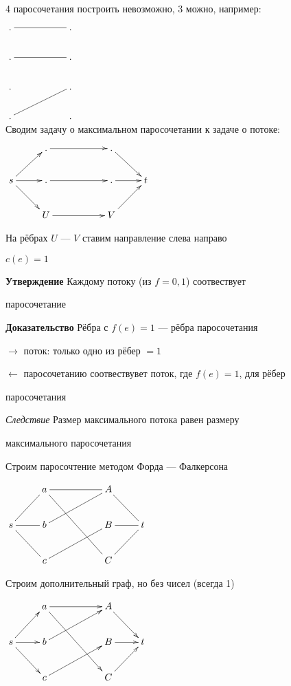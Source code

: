 \documentclass[a4paper, 12pt] {article}
\begin{document}
4 паросочетания построить невозможно, 3 можно, например:

 $\xymatrix{
	.  \ar@{-}[rr]  & & . \\
	.   \ar@{-}[rr] & & . \\
	.    & &  . \\
	.  \ar@{-}[rru]  & &  . \\
}$\\

Сводим задачу о максимальном паросочетании к задаче о потоке:

$\xymatrix{
& 	. \ar@{->}[rr]   & & . \\
s \ar@{->}[r] \ar@{->}[rd] \ar@{->}[ru] &	. \ar@{->}[rr]    & & . & t \ar@{<-}[l] \ar@{<-}[ld] \ar@{<-}[lu] \\
&	U \ar@{->}[rr]   & & V \\
}$

На рёбрах $ U $ --- $ V $ ставим направление слева направо

$ c(e) = 1 $

\textbf{Утверждение} 
Каждому потоку  (из $ f = 0, 1 $) соотвествует 

паросочетание

\textbf{Доказательство} Рёбра с $ f(e)=1 $ --- рёбра паросочетания

$ \rightarrow $ поток: только одно из рёбер $ = 1 $

$ \leftarrow $ паросочетанию соотвествувет поток, где $ f(e)=1 $, для рёбер 

паросочетания

\textit{Следствие} Размер максимального потока равен размеру

 максимального паросочетания

Строим паросочтение методом Форда — Фалкерсона

$\xymatrix{
	& 	a \ar@{-}[rr] \ar@{-}[rrdd]  & & A \\
	s \ar@{-}[r] \ar@{-}[rd] \ar@{-}[ru] &	b \ar@{-}[rru]    & & B & t \ar@{-}[l] \ar@{-}[ld] \ar@{-}[lu] \\
	&	c \ar@{-}[rru]   & & C \\
}$

Строим дополнительный граф, но без чисел (всегда 1)

$\xymatrix{
	& 	a \ar@{->}[rr] \ar@{->}[rrdd]  & & A \\
	s \ar@{->}[r] \ar@{->}[rd] \ar@{->}[ru] &	b \ar@{->}[rru]    & & B & t \ar@{<-}[l] \ar@{<-}[ld] \ar@{<-}[lu] \\
	&	c \ar@{->}[rru]   & & C \\
}$\\
\end{document}
